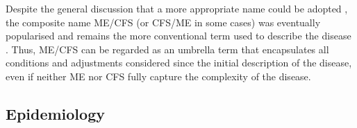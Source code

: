 Despite the general discussion that a more appropriate name could be adopted \citep{nacul2021EuropeanNetwork}, the composite name ME/CFS (or CFS/ME in some cases) was eventually popularised and remains the more conventional term used to describe the disease \citep{carruthers2003MyalgicEncephalomyelitis}.
Thus, ME/CFS can be regarded as an umbrella term that encapsulates all conditions and adjustments considered since the initial description of the disease, even if neither ME nor CFS fully capture the complexity of the disease.


\subsection{Epidemiology}
\label{subsec:epidemiology}

